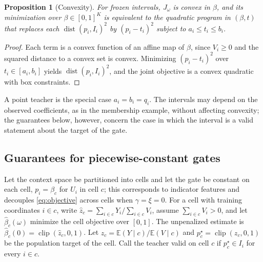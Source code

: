 \documentclass[11pt]{article}
\theoremstyle{plain}
\newtheorem{proposition}{Proposition}
\theoremstyle{definition}
\theoremstyle{remark}
\newcommand{\E}{\mathbb E}
\DeclareMathOperator{\clip}{clip}
\DeclareMathOperator{\dist}{dist}
\begin{document}
\begin{proposition}[Convexity]\label{prop:convex}
For frozen intervals, $J_\omega$ is convex in $\beta$, and its minimization over
$\beta\in[0,1]^K$ is equivalent to the quadratic program in $(\beta,t)$ that replaces each
$\dist(p_i,I_i)^2$ by $(p_i-t_i)^2$ subject to $a_i\le t_i\le b_i$.
\end{proposition}

\begin{proof}
Each term is a convex function of an affine map of $\beta$, since $V_i\ge0$ and the squared
distance to a convex set is convex. Minimizing $(p_i-t_i)^2$ over $t_i\in[a_i,b_i]$ yields
$\dist(p_i,I_i)^2$, and the joint objective is a convex quadratic with box constraints.
\end{proof}

A point teacher is the special case $a_i=b_i=q_i$. The intervals may depend on the observed
coefficients, as in the membership example, without affecting convexity; the guarantees
below, however, concern the case in which the interval is a valid statement about the
target of the gate.

\subsection{Guarantees for piecewise-constant gates}

Let the context space be partitioned into cells and let the gate be constant on each cell,
$p_i=\beta_c$ for $U_i$ in cell $c$; this corresponds to indicator features and decouples
\eqref{eq:objective} across cells when $\gamma=\xi=0$. For a cell with training
coordinates $i\in c$, write $\widehat z_c=\sum_{i\in c}Y_i/\sum_{i\in c}V_i$, assume
$\sum_{i\in c}V_i>0$, and let $\widehat\beta_c(\omega)$ minimize the cell objective over
$[0,1]$. The unpenalized estimate is $\widehat\beta_c(0)=\clip(\widehat z_c,0,1)$. Let
$z_c=\E(Y\mid c)/\E(V\mid c)$ and $p_c^\star=\clip(z_c,0,1)$ be the population target of the
cell. Call the teacher valid on cell $c$ if $p^\star_c\in I_i$ for every $i\in c$.
\end{document}
